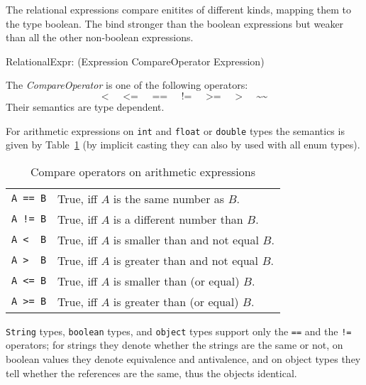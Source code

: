 The relational expressions compare enitites of different kinds, mapping them to the type boolean.
The bind stronger than the boolean expressions but weaker than all the other non-boolean expressions.

\begin{rail}
 RelationalExpr: (Expression CompareOperator Expression)
\end{rail}

The \emph{CompareOperator} is one of the following operators:
\[ \texttt{<} \;\;\;\;\; \texttt{<=} \;\;\;\;\; \texttt{==} \;\;\;\;\; \texttt{!=} \;\;\;\;\; \texttt{>=} \;\;\;\;\; \texttt{>} \;\;\;\;\; \texttt{\textasciitilde\textasciitilde} \]
Their semantics are type dependent.

For arithmetic expressions on \texttt{int} and \texttt{float} or \texttt{double} types
the semantics is given by Table~\ref{compandarithmetic} (by implicit casting they can also by used with all enum types).

\begin{table}[htbp]
  \centering
  \begin{tabularx}{\linewidth}{|l|X|} \hline
    \texttt{A == B} & True, iff $A$ is the same number as $B$. \\
    \texttt{A != B} & True, iff $A$ is a different number than $B$. \\
    \texttt{A <\ \ B} & True, iff $A$ is smaller than and not equal $B$. \\
    \texttt{A >\ \ B} & True, iff $A$ is greater than and not equal $B$. \\
    \texttt{A <= B} & True, iff $A$ is smaller than (or equal) $B$. \\
    \texttt{A >= B} & True, iff $A$ is greater than (or equal) $B$. \\ \hline
  \end{tabularx}
  \caption{Compare operators on arithmetic expressions}
  \label{compandarithmetic}
\end{table}

\texttt{String} types, \texttt{boolean} types, and \texttt{object} types support only the \texttt{==} and the \texttt{!=} operators;
for strings they denote whether the strings are the same or not,
on boolean values they denote equivalence and antivalence,
and on object types they tell whether the references are the same, thus the objects identical.

